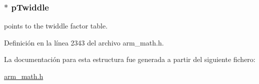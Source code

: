 \subsubsection[{\texorpdfstring{p\+Twiddle}{pTwiddle}}]{$\ast$ p\+Twiddle}\hypertarget{structarm__dct4__instance__q15_aa8c837c05b2c910342ab8f171d30dc02}{}\label{structarm__dct4__instance__q15_aa8c837c05b2c910342ab8f171d30dc02}
points to the twiddle factor table. 

Definición en la línea 2343 del archivo arm\+\_\+math.\+h.



La documentación para esta estructura fue generada a partir del siguiente fichero\+:\begin{DoxyCompactItemize}
\item 
\hyperlink{arm__math_8h}{arm\+\_\+math.\+h}\end{DoxyCompactItemize}
